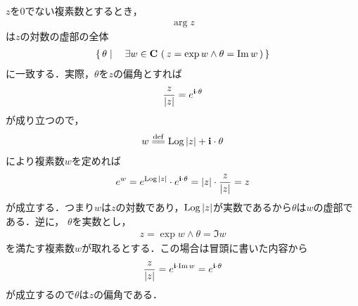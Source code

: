 	$z$を$0$でない複素数とするとき，
	\begin{align}
		\arg{z}
	\end{align}
	は$z$の対数の虚部の全体
	\begin{align}
		\left\{\, \theta \mid \quad \exists w \in \mathbf{C}\, \left(\, z = \exp{w} \wedge \theta = \operatorname{Im} w\, \right)\, \right\}
	\end{align}
	に一致する．実際，$\theta$を$z$の偏角とすれば
	\begin{align}
		\frac{z}{|z|} = e^{\mathbf{i} \cdot \theta}
	\end{align}
	が成り立つので，
	\begin{align}
		w \defeq \pvlog{|z|} + \isym \cdot \theta
	\end{align}
	により複素数$w$を定めれば
	\begin{align}
		e^{w} = e^{\operatorname{Log}{|z|}} \cdot e^{\mathbf{i} \cdot \theta} = |z| \cdot \frac{z}{|z|} = z
	\end{align}
	が成立する．つまり$w$は$z$の対数であり，$\operatorname{Log}{|z|}$が実数であるから$\theta$は$w$の虚部である．逆に，
	$\theta$を実数とし，
	\begin{align}
		z = \exp{w} \wedge \theta = \Im{w}
	\end{align}
	を満たす複素数$w$が取れるとする．この場合は冒頭に書いた内容から
	\begin{align}
		\frac{z}{|z|} = e^{\mathbf{i} \cdot \operatorname{Im} w} = e^{\mathbf{i} \cdot \theta}
	\end{align}
	が成立するので$\theta$は$z$の偏角である．
	
	